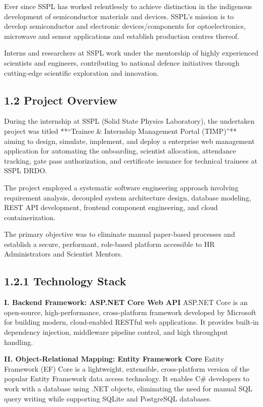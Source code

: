 \documentclass[12pt,a4paper]{article}
\begin{document}
Ever since SSPL has worked relentlessly to achieve distinction in the indigenous development of semiconductor materials and devices. SSPL's mission is to develop semiconductor and electronic devices/components for optoelectronics, microwave and sensor applications and establish production centres thereof.

Interns and researchers at SSPL work under the mentorship of highly experienced scientists and engineers, contributing to national defence initiatives through cutting-edge scientific exploration and innovation.

\newpage
\subsection{1.2 Project Overview}

During the internship at SSPL (Solid State Physics Laboratory), the undertaken project was titled **“Trainee \& Internship Management Portal (TIMP)”** aiming to design, simulate, implement, and deploy a enterprise web management application for automating the onboarding, scientist allocation, attendance tracking, gate pass authorization, and certificate issuance for technical trainees at SSPL DRDO.

The project employed a systematic software engineering approach involving requirement analysis, decoupled system architecture design, database modeling, REST API development, frontend component engineering, and cloud containerization.

The primary objective was to eliminate manual paper-based processes and establish a secure, performant, role-based platform accessible to HR Administrators and Scientist Mentors.

\subsection{1.2.1 Technology Stack}

\textbf{I. Backend Framework: ASP.NET Core Web API}
ASP.NET Core is an open-source, high-performance, cross-platform framework developed by Microsoft for building modern, cloud-enabled RESTful web applications. It provides built-in dependency injection, middleware pipeline control, and high throughput handling.

\textbf{II. Object-Relational Mapping: Entity Framework Core}
Entity Framework (EF) Core is a lightweight, extensible, cross-platform version of the popular Entity Framework data access technology. It enables C\# developers to work with a database using .NET objects, eliminating the need for manual SQL query writing while supporting SQLite and PostgreSQL databases.
\end{document}
